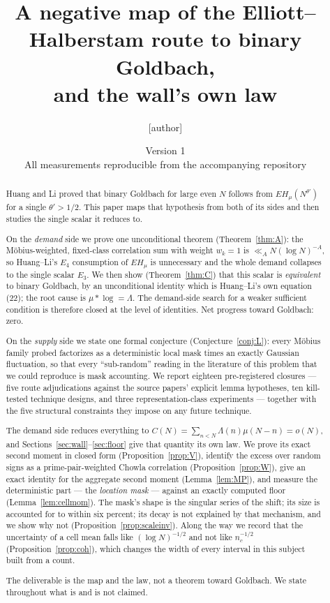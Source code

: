 \documentclass[11pt,a4paper]{article}
\title{A negative map of the Elliott--Halberstam route to binary
Goldbach,\\ and the wall's own law}
\author{[author]}
\date{Version 1\\
\small All measurements reproducible from the accompanying repository}
\theoremstyle{plain}
\theoremstyle{definition}
\begin{document}
\maketitle

\begin{abstract}
Huang and Li proved that binary Goldbach for large even $N$ follows
from $EH_\mu(N^{\theta'})$ for a single $\theta' > 1/2$. This paper
maps that hypothesis from both of its sides and then studies the
single scalar it reduces to.

On the \emph{demand} side we prove one unconditional theorem
(Theorem~\ref{thm:A}): the M\"obius-weighted, fixed-class correlation
sum with weight $w_k = 1$ is $\ll_A N(\log N)^{-A}$, so Huang--Li's
$E_4$ consumption of $EH_\mu$ is unnecessary and the whole demand
collapses to the single scalar $E_3$. We then show
(Theorem~\ref{thm:C}) that this scalar is \emph{equivalent} to binary
Goldbach, by an unconditional identity which is Huang--Li's own
equation (22); the root cause is $\mu * \log = \Lambda$. The
demand-side search for a weaker sufficient condition is therefore
closed at the level of identities. Net progress toward Goldbach: zero.

On the \emph{supply} side we state one formal conjecture
(Conjecture~\ref{conj:L}): every M\"obius family probed factorizes as
a deterministic local mask times an exactly Gaussian fluctuation, so
that every ``sub-random'' reading in the literature of this problem
that we could reproduce is mask accounting. We report eighteen
pre-registered closures --- five route adjudications against the
source papers' explicit lemma hypotheses, ten kill-tested technique
designs, and three representation-class experiments --- together with
the five structural constraints they impose on any future technique.

The demand side reduces everything to
$C(N)=\sum_{n<N}\Lambda(n)\mu(N-n) = o(N)$, and
Sections~\ref{sec:wall}--\ref{sec:floor} give that quantity its own
law. We prove its exact second moment in closed form
(Proposition~\ref{prop:V}), identify the excess over random signs as a
prime-pair-weighted Chowla correlation (Proposition~\ref{prop:W}),
give an exact identity for the aggregate second moment
(Lemma~\ref{lem:MP}), and measure the deterministic part --- the
\emph{location mask} --- against an exactly computed floor
(Lemma~\ref{lem:cellmom}). The mask's shape is the singular series of
the shift; its size is accounted for to within six percent; its decay
is not explained by that mechanism, and we show why not
(Proposition~\ref{prop:scaleinv}). Along the way we record that the
uncertainty of a cell mean falls like $(\log N)^{-1/2}$ and not like
$n_c^{-1/2}$ (Proposition~\ref{prop:coh}), which changes the width of
every interval in this subject built from a count.

The deliverable is the map and the law, not a theorem toward Goldbach.
We state throughout what is and is not claimed.
\end{abstract}
\end{document}
